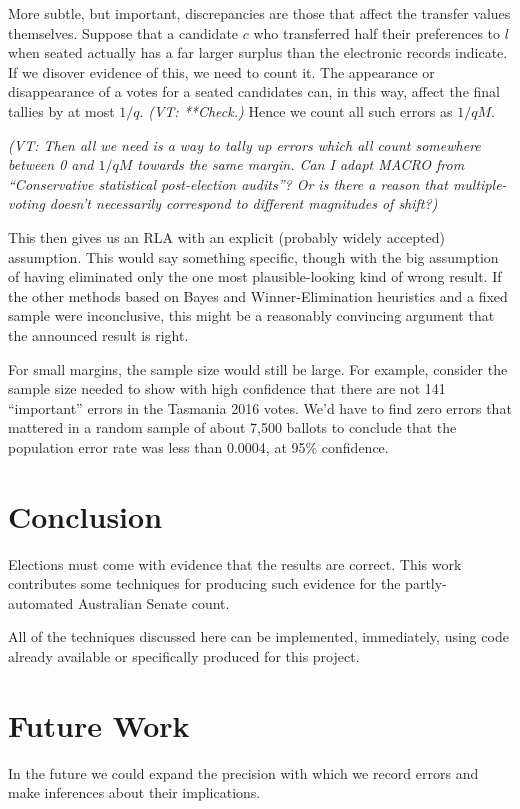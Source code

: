 \documentclass[10pt,a4paper]{article}
\newcommand{\VTNote}[1]{{\it(VT: #1)}}
\begin{document}
More subtle, but important, discrepancies are those that affect the transfer values themselves.  Suppose that a candidate $c$ who transferred half their preferences to $l$ when seated actually has a far larger surplus than the electronic records indicate.  If we disover evidence of this, we need to count it. The appearance or disappearance of a votes for a seated candidates can, in this way, affect the final tallies by at most $1/q$.  \VTNote{**Check.} Hence we count all such errors as $1/qM$.

\VTNote{
Then all we need is a way to tally up errors which all count somewhere between 0 and $1/qM$ towards the same margin.  Can I adapt MACRO from ``Conservative statistical post-election audits''? Or is there a reason that multiple-voting doesn't necessarily correspond to different magnitudes of shift?}

This then gives us an RLA with an explicit (probably widely accepted) assumption.  This would say something specific, though with the big assumption of having eliminated only the one most plausible-looking kind of wrong result.  If the other methods based on Bayes and Winner-Elimination heuristics and a fixed sample were inconclusive, this might be a reasonably convincing argument that the announced result is right.  

For small margins, the sample size would still be large.  
For example, consider the sample size needed to show with high confidence that there are not 141 ``important'' errors in the Tasmania 2016 votes.
We'd have to find zero errors that mattered in a random sample of about 7,500 ballots to conclude that the population error rate was less than 0.0004, at 95\% confidence.

\section{Conclusion}
Elections must come with evidence that the results are correct.  This work contributes some techniques for producing such evidence for the partly-automated Australian Senate count.

All of the techniques discussed here can be implemented, immediately, using code already available or specifically produced for this project.

\section{Future Work}
In the future we could expand the precision with which we record errors and make inferences about their implications.
\end{document}
